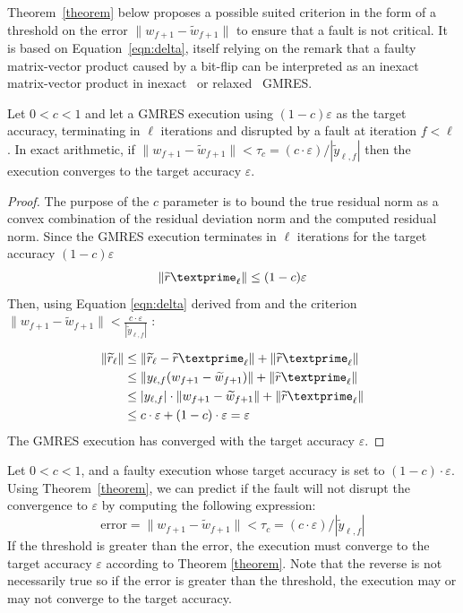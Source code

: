 Theorem~\ref{theorem} below proposes a possible suited criterion in the form of a threshold on the error $\|{w}_{f+1} - \widetilde{w}_{f+1}\|$ to ensure that a fault is not critical.
It is based on Equation~\eqref{eqn:delta}, itself relying on the remark that a faulty matrix-vector product caused by a bit-flip can be interpreted as an inexact matrix-vector product in inexact~\cite{sisz:03} or
relaxed~\cite{DBLP:journals/siamsc/GiraudGL07} GMRES.
\begin{theorem}\label{theorem}
Let $0 < c < 1$ and let a GMRES execution using $(1-c) \varepsilon$ as the target accuracy, terminating in $\ell$ iterations and disrupted by a fault at iteration $f < \ell$. In exact arithmetic, if $\|{w}_{f+1} - \widetilde{w}_{f+1}\| < \tau_c = (c \cdot \varepsilon) / |\widetilde{y}_{\ell, f}|$ then the execution converges to the target accuracy $\varepsilon$.
\end{theorem}
\begin{proof}
The purpose of the $c$ parameter is to bound the true residual norm as a convex combination of the residual deviation norm and the computed residual norm.
Since the GMRES execution terminates in $\ell$ iterations for the target accuracy $(1 - c) \varepsilon$ $$\|\widetilde{r}\textprime_{\ell}\| \leq (1 - c) \varepsilon$$
Then, using Equation \eqref{eqn:delta} derived from \cite{DBLP:journals/siamsc/GiraudGL07} and the criterion $\|{w}_{f+1} - \widetilde{w}_{f+1}\| < \frac{c \cdot \varepsilon}{|\widetilde{y}_{\ell, f}|}$ :

\begin{equation}
%
\begin{split}
    \|\widetilde{r}_\ell\| & \leq \|\widetilde{r}_\ell - \widetilde{r}\textprime_\ell \| + \|\widetilde{r}\textprime_\ell\| \\
    &\leq \|y_{\ell, f} (w_{f+1} - \widetilde{w}_{f+1}) \| + \|\widetilde{r}\textprime_\ell\| \\
    &\leq |y_{\ell, f}| \cdot \|{w}_{f+1} - \widetilde{w}_{f+1}\| + \|\widetilde{r}\textprime_\ell\| \\
     &\leq c \cdot \varepsilon + (1 - c) \cdot \varepsilon = \varepsilon\\
%
\end{split}
\end{equation}
The GMRES execution has converged with the target accuracy $\varepsilon$.
\end{proof}
Let $0 < c < 1$, and a faulty execution whose target accuracy is set to $(1 - c) \cdot \varepsilon$. Using Theorem~\ref{theorem}, we can predict if the fault will not disrupt the convergence to $\varepsilon$ by computing the following expression:
\begin{equation}
	\text{error} = \|{w}_{f+1} - \widetilde{w}_{f+1}\| < \tau_c = (c \cdot \varepsilon) / |\widetilde{y}_{\ell, f}|
\end{equation}\label{scheme_oracle}
If the threshold is greater than the error, the execution must converge to the target accuracy $\varepsilon$ according to Theorem \ref{theorem}. Note that the reverse is not necessarily true so if the error is greater than the threshold, the execution may or may not converge to the target accuracy. 

